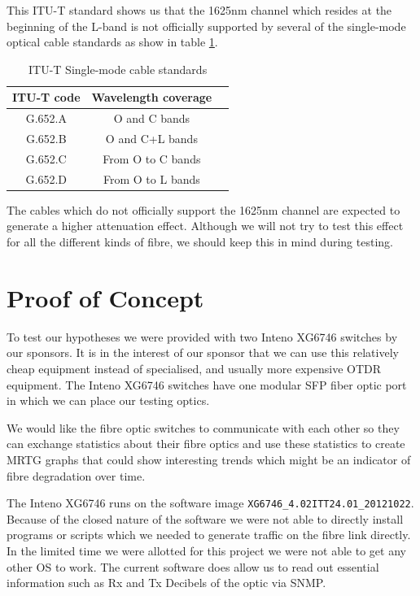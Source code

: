 \documentclass{article}
\begin{document}
This ITU-T standard shows us that the 1625nm channel which resides at the beginning of the L-band is not officially supported by several of the single-mode optical cable standards as show in table \ref{tab:single-mode_types}.

\begin{table}[h]
\centering
\label{tab:single-mode_types}
\caption{ITU-T Single-mode cable standards}
\begin{tabular}{|c|c|c|}
\hline 
ITU-T code & Wavelength coverage\\ 
\hline 
G.652.A & O and C bands \\ 
\hline
G.652.B & O and C+L bands \\
\hline
G.652.C & From O to C bands \\
\hline
G.652.D & From O to L bands \\
\hline
\end{tabular} 
\end{table}

The cables which do not officially support the 1625nm channel are expected to generate a higher attenuation effect. Although we will not try to test this effect for all the different kinds of fibre, we should keep this in mind during testing.

\newpage
\section{Proof of Concept}
To test our hypotheses we were provided with two Inteno XG6746\cite{Inteno:XG6746} switches by our sponsors. It is in the interest of our sponsor that we can use this relatively cheap equipment instead of specialised, and usually more expensive OTDR equipment. The Inteno XG6746 switches have one modular SFP fiber optic port in which we can place our testing optics. 

We would like the fibre optic switches to communicate with each other so they can exchange statistics about their fibre optics and use these statistics to create MRTG\cite{MRTG:MRTG} graphs that could show interesting trends which might be an indicator of fibre degradation over time.

The Inteno XG6746 runs on the software image \texttt{XG6746\_4.02ITT24.01\_20121022}. Because of the closed nature of the software we were not able to directly install programs or scripts which we needed to generate traffic on the fibre link directly.
In the limited time we were allotted for this project we were not able to get any other OS to work. The current software does allow us to read out essential information such as Rx and Tx Decibels of the optic via SNMP.
\end{document}
